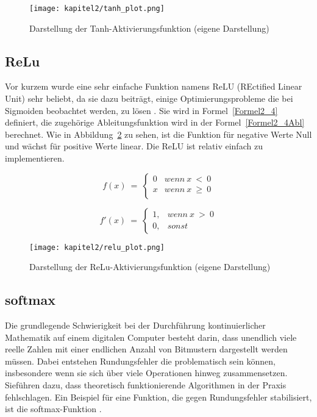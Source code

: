 \begin{figure}[H]
    \centering
    \texttt{[image: kapitel2/tanh\_plot.png]}
    \caption[Darstellung der Tanh-Aktivierungsfunktion]{Darstellung der Tanh-Aktivierungsfunktion (eigene Darstellung)}
    \label{Kap2:Tanh_plot}
\end{figure}

\subsection{ReLu}
Vor kurzem wurde eine sehr einfache Funktion namens ReLU (REctified Linear Unit) sehr beliebt, da sie dazu beiträgt, einige Optimierungsprobleme die bei Sigmoiden beobachtet werden, zu lösen \cite*[11]{AntonioGuili;AmitaKapoor;SujitPal2019}. Sie wird in Formel~\ref{Formel2_4} definiert, die zugehörige Ableitungsfunktion wird in der Formel~\ref{Formel2_4Abl} berechnet. Wie in Abbildung~\ref{Kap2:ReLu_plot} zu sehen, ist die Funktion für negative Werte Null und wächst für positive Werte linear. Die ReLU ist relativ einfach zu implementieren.

\begin{equation} \label{Formel2_4}
    f( x) \ =\ \begin{cases}
        0 & wenn\ x\  <\ 0    \\
        x & wenn\ x\  \geq\ 0 \\
    \end{cases}
\end{equation}

\begin{equation} \label{Formel2_4Abl}
    f'( x) \ =\ \begin{cases}
        1, & wenn\ x\  >\ 0 \\
        0, & sonst
    \end{cases}
\end{equation}

\begin{figure}[H]
    \centering
    \texttt{[image: kapitel2/relu\_plot.png]}
    \caption[Darstellung der ReLu-Aktivierungsfunktion]{Darstellung der ReLu-Aktivierungsfunktion (eigene Darstellung)}
    \label{Kap2:ReLu_plot}
\end{figure}

\subsection{softmax}
Die grundlegende Schwierigkeit bei der Durchführung kontinuierlicher Mathematik auf einem digitalen Computer besteht darin, dass unendlich viele reelle Zahlen mit einer endlichen Anzahl von Bitmustern dargestellt werden müssen. Dabei entstehen Rundungsfehler die problematisch sein können, insbesondere wenn sie sich über viele Operationen hinweg zusammensetzen. Sieführen dazu, dass theoretisch funktionierende Algorithmen in der Praxis fehlschlagen. Ein Beispiel für eine Funktion, die gegen Rundungsfehler stabilisiert, ist die softmax-Funktion \cite*[80-81]{IanGoodfellowYoshuaBengio2016}.

